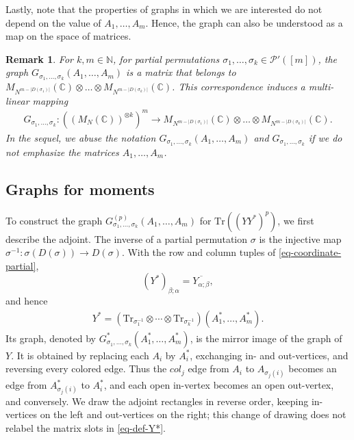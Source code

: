 \documentclass[12pt]{article}
\numberwithin{equation}{section}
\theoremstyle{plain}
\newtheorem{remark}[theorem]{Remark}
\def\bN{\mathbb N}
\def\bC{\mathbb C}
\def\cP{\mathcal P}
\def\Tr{\mathrm {Tr}}
\begin{document}
Lastly, note that the properties of graphs in which we are interested do
not depend on the value of $A_1,\ldots,A_m$. Hence, the graph can also be understood as a map on the space of matrices.

\begin{remark}
For $k,m \in \bN$, for partial permutations $\sigma_1,\ldots,\sigma_k \in \cP'([m])$, the graph $G_{\sigma_1,\ldots,\sigma_k} (A_1,\ldots,A_m)$ is a matrix that belongs to $M_{N^{m-|D(\sigma_1)|}}(\bC) \otimes \ldots \otimes M_{N^{m-|D(\sigma_k)|}}(\bC)$. This correspondence induces a multi-linear mapping
\begin{align*}
    G_{\sigma_1,\ldots,\sigma_k}: \left( \left( M_N(\bC) \right)^{\otimes k} \right)^m
    \longrightarrow M_{N^{m-|D(\sigma_1)|}}(\bC) \otimes \ldots \otimes M_{N^{m-|D(\sigma_k)|}}(\bC).
\end{align*}
In the sequel, we abuse the notation $G_{\sigma_1,\ldots,\sigma_k} (A_1,\ldots,A_m)$ and $G_{\sigma_1,\ldots,\sigma_k}$ if we do not emphasize the matrices $A_1,\ldots,A_m$.
\end{remark}

\subsection{Graphs for moments} \label{sec:graph-moment}

To construct the graph $G^{(p)}_{\sigma_1,\ldots,\sigma_k}(A_1,\ldots,A_m)$ for $\Tr((YY^*)^p)$, we first describe the adjoint. The inverse of a partial permutation $\sigma$ is the injective map $\sigma^{-1}:\sigma(D(\sigma))\to D(\sigma)$. With the row and column tuples of \eqref{eq-coordinate-partial},
\[
(Y^*)_{\beta;\alpha}=\overline{Y_{\alpha;\beta}},
\]
and hence
\begin{align}\label{eq-def-Y*}
Y^*=(\Tr_{\sigma_1^{-1}}\otimes\cdots\otimes\Tr_{\sigma_k^{-1}})(A_1^*,\ldots,A_m^*).
\end{align}
Its graph, denoted by $G^*_{\sigma_1,\ldots,\sigma_k}(A_1^*,\ldots,A_m^*)$, is the mirror image of the graph of $Y$. It is obtained by replacing each $A_i$ by $A_i^*$, exchanging in- and out-vertices, and reversing every colored edge. Thus the $col_j$ edge from $A_i$ to $A_{\sigma_j(i)}$ becomes an edge from $A_{\sigma_j(i)}^*$ to $A_i^*$, and each open in-vertex becomes an open out-vertex, and conversely. We draw the adjoint rectangles in reverse order, keeping in-vertices on the left and out-vertices on the right; this change of drawing does not relabel the matrix slots in \eqref{eq-def-Y*}.
\end{document}
